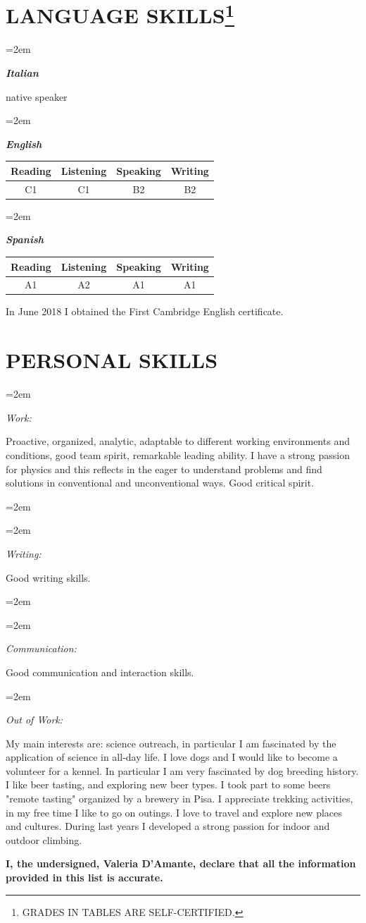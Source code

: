 \documentclass[paper=a4,fontsize=12pt]{article} %
\newlength{\spacebox}
\newcommand{\sepspace}{\vspace*{1em}}		%
\newcommand{\NewPart}[1]{\section*{\uppercase{#1}}}
\newcommand{\PersonalEntry}[2]{
	\noindent\hangindent=2em\hangafter=0 %
	\vspace{0.7em}
	\parbox{\spacebox}{        %
		\footnotesize{\textit{#1}}}		       %
	\hspace{1.3em} #2 \par}    %
\newcommand{\SkillsEntry}[2]{      %
	\noindent\hangindent=2em\hangafter=0 %
	\parbox{\spacebox}{        %
		\textit{#1}}			   %
	\hspace{1.5em} #2 \par}    %
\begin{document}
 	\NewPart{Language Skills\footnote{G\lowercase{rades in tables are self-certified.}}}
	\SkillsEntry{\textbf{Italian}}{native speaker}\vspace{3mm}
	\sepspace
	\SkillsEntry{\textbf{English}}{
	\begin{table}[h]
		\vspace{-8mm}\qquad \qquad \qquad \qquad \qquad
		\begin{tabular}{cccc}
			 Reading & Listening & Speaking & Writing  \\
			\midrule
			  C1 & C1 & B2 & B2 \\
			\bottomrule
		\end{tabular}
	\end{table} }
	\sepspace
	\SkillsEntry{\textbf{Spanish}}{
	
	\begin{table}[h]
		\vspace{-8.05mm}\qquad \qquad \qquad \qquad \qquad
		\begin{tabular}{cccc}
		
			Reading & Listening & Speaking & Writing  \\
			\midrule
			A1 & A2 & A1 & A1 \\
			\bottomrule
		\end{tabular}
	\end{table}}
	In June 2018 I obtained the First Cambridge English certificate.\; \cite{certificato_inglese}
	\sepspace 
	\NewPart{Personal Skills}{}
	\SkillsEntry{Work:}{\hspace{-1.9cm} Proactive, organized, analytic, adaptable to different working environments and conditions, good team spirit, remarkable leading ability. I have a strong passion for physics and this reflects in the eager to understand problems and find solutions in conventional and unconventional ways. Good critical spirit.}
	\SkillsEntry{}{}
	\SkillsEntry{Writing:}{\hspace{-1.55cm} Good writing skills.} 
	\SkillsEntry{}{}
	\SkillsEntry{Communication: }{\hspace{-.38cm} Good communication and interaction skills.\\}
	\SkillsEntry{Out of Work: }{\hspace{-.8cm} My main interests are: science outreach, in particular I am fascinated by the application of science in all-day life. I love dogs and I would like to become a volunteer for a kennel. In particular I am very fascinated by dog breeding history. I like beer tasting, and exploring new beer types. I took part to some beers "remote tasting" organized by a brewery in Pisa. I appreciate trekking activities, in my free time I like to go on outings. I love to travel and explore new places and cultures. During last years I developed a strong passion for indoor and outdoor climbing.}
	\vspace{5mm}
\textbf{I, the undersigned, Valeria D'Amante, declare that all the information provided in this list is accurate.}
\end{document}

